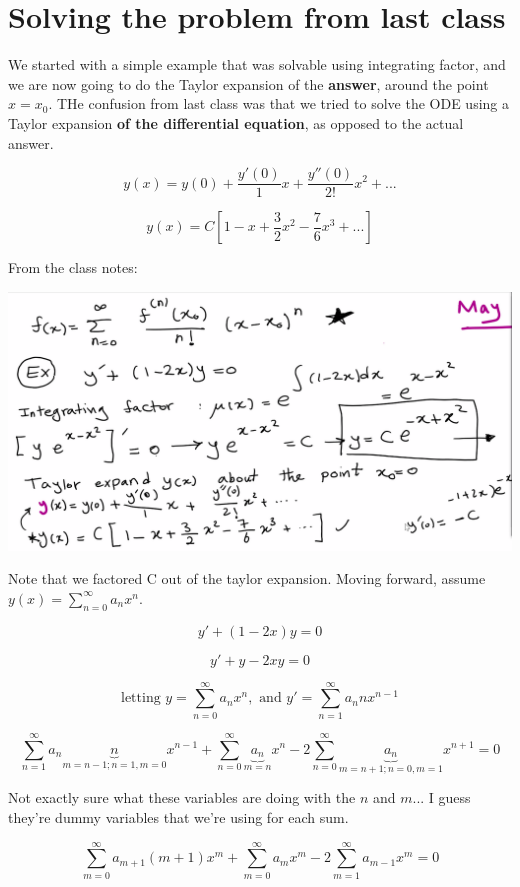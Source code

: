 \graphicspath{{./Lecture2/}}
\section{Solving the problem from last class}

We started with a simple example that was solvable using integrating factor, and we are now going to do the Taylor expansion of the \textbf{answer}, around the point $x = x_0$. THe confusion from last class was that we tried to solve the ODE using a Taylor expansion \textbf{of the differential equation}, as opposed to the actual answer. 

$$y(x) = y(0) + \frac{y'(0)}{1} x + \frac{y''(0)}{2!} x^2 + ...$$

$$y(x) = C \left[1 - x + \frac{3}{2} x^2 - \frac{7}{6} x^3 + ... \right]$$

From the class notes:

\includegraphics[width = 0.9 \textwidth]{image1.png}

Note that we factored C out of the taylor expansion. Moving forward, assume $y(x) = \sum_{n = 0}^{\infty} a_n x^n$. 

$$y' + (1 - 2x) y = 0$$

$$y' + y - 2xy = 0$$

$$\text{letting } y = \sum_{n = 0}^{\infty} a_n x^n, \text{ and } y' = \sum_{n = 1}^{\infty} a_n n x^{n-1}$$

$$\sum_{n = 1}^{\infty} a_n \underbrace{n}_{m = n-1; n = 1, m = 0} x^{n-1} + \sum_{n = 0}^{\infty} \underbrace{a_n}_{m = n} x^n - 2 \sum_{n = 0}^{\infty} \underbrace{a_n}_{m = n+1;  n = 0, m = 1} x^{n+1} = 0$$

Not exactly sure what these variables are doing with the $n$ and $m$... I guess they're dummy variables that we're using for each sum. 

$$ \sum_{m = 0}^{\infty} a_{m+1} (m+1)x^m + \sum_{m = 0}^{\infty} a_m x^m - 2 \sum_{m = 1}^{\infty} a_{m-1} x^m = 0$$

